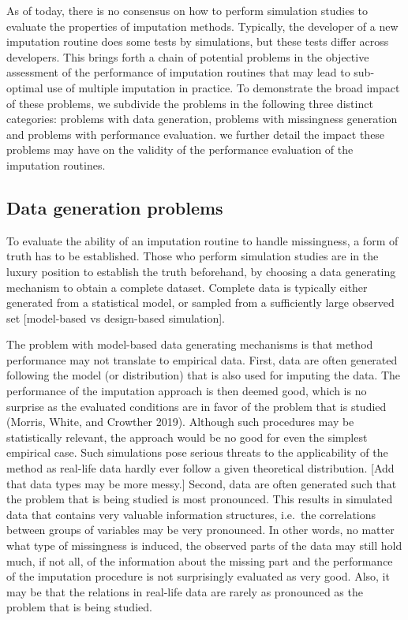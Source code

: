 \documentclass[
]{article}
\begin{document}
As of today, there is no consensus on how to perform simulation studies
to evaluate the properties of imputation methods. Typically, the
developer of a new imputation routine does some tests by simulations,
but these tests differ across developers. This brings forth a chain of
potential problems in the objective assessment of the performance of
imputation routines that may lead to sub-optimal use of multiple
imputation in practice. To demonstrate the broad impact of these
problems, we subdivide the problems in the following three distinct
categories: problems with data generation, problems with missingness
generation and problems with performance evaluation. we further detail
the impact these problems may have on the validity of the performance
evaluation of the imputation routines.

\hypertarget{data-generation-problems}{%
\subsection{Data generation problems}\label{data-generation-problems}}

To evaluate the ability of an imputation routine to handle missingness,
a form of truth has to be established. Those who perform simulation
studies are in the luxury position to establish the truth beforehand, by
choosing a data generating mechanism to obtain a complete dataset.
Complete data is typically either generated from a statistical model, or
sampled from a sufficiently large observed set {[}model-based vs
design-based simulation{]}.

The problem with model-based data generating mechanisms is that method
performance may not translate to empirical data. First, data are often
generated following the model (or distribution) that is also used for
imputing the data. The performance of the imputation approach is then
deemed good, which is no surprise as the evaluated conditions are in
favor of the problem that is studied (Morris, White, and Crowther 2019).
Although such procedures may be statistically relevant, the approach
would be no good for even the simplest empirical case. Such simulations
pose serious threats to the applicability of the method as real-life
data hardly ever follow a given theoretical distribution. {[}Add that
data types may be more messy.{]} Second, data are often generated such
that the problem that is being studied is most pronounced. This results
in simulated data that contains very valuable information structures,
i.e.~the correlations between groups of variables may be very
pronounced. In other words, no matter what type of missingness is
induced, the observed parts of the data may still hold much, if not all,
of the information about the missing part and the performance of the
imputation procedure is not surprisingly evaluated as very good. Also,
it may be that the relations in real-life data are rarely as pronounced
as the problem that is being studied.
\end{document}
